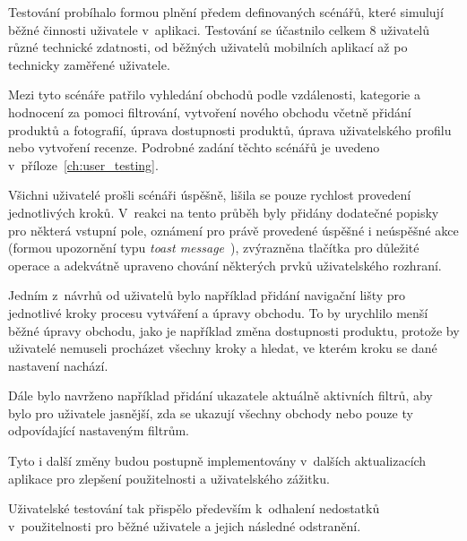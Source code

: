 Testování probíhalo formou plnění předem definovaných scénářů, které simulují běžné činnosti uživatele v~aplikaci.
Testování se účastnilo celkem 8 uživatelů různé technické zdatnosti, od běžných uživatelů mobilních aplikací až po technicky zaměřené uživatele.

Mezi tyto scénáře patřilo vyhledání obchodů podle vzdálenosti, kategorie a hodnocení za pomoci filtrování, vytvoření nového obchodu včetně přidání produktů a fotografií, úprava dostupnosti produktů, úprava uživatelského profilu nebo vytvoření recenze.
Podrobné zadání těchto scénářů je uvedeno v~příloze~\ref{ch:user_testing}.

Všichni uživatelé prošli scénáři úspěšně, lišila se pouze rychlost provedení jednotlivých kroků.
V~reakci na tento průběh byly přidány dodatečné popisky pro některá vstupní pole, oznámení pro právě provedené úspěšné i neúspěšné akce (formou upozornění typu \textit{toast message}~\parencite{android_toast_message}), zvýrazněna tlačítka pro důležité operace a adekvátně upraveno chování některých prvků uživatelského rozhraní.

Jedním z~návrhů od uživatelů bylo například přidání navigační lišty pro jednotlivé kroky procesu vytváření a úpravy obchodu.
To by urychlilo menší běžné úpravy obchodu, jako je například změna dostupnosti produktu, protože by uživatelé nemuseli procházet všechny kroky a hledat, ve kterém kroku se dané nastavení nachází.

Dále bylo navrženo například přidání ukazatele aktuálně aktivních filtrů, aby bylo pro uživatele jasnější, zda se ukazují všechny obchody nebo pouze ty odpovídající nastaveným filtrům.

Tyto i další změny budou postupně implementovány v~dalších aktualizacích aplikace pro zlepšení použitelnosti a uživatelského zážitku.

Uživatelské testování tak přispělo především k~odhalení nedostatků v~použitelnosti pro běžné uživatele a jejich následné odstranění.